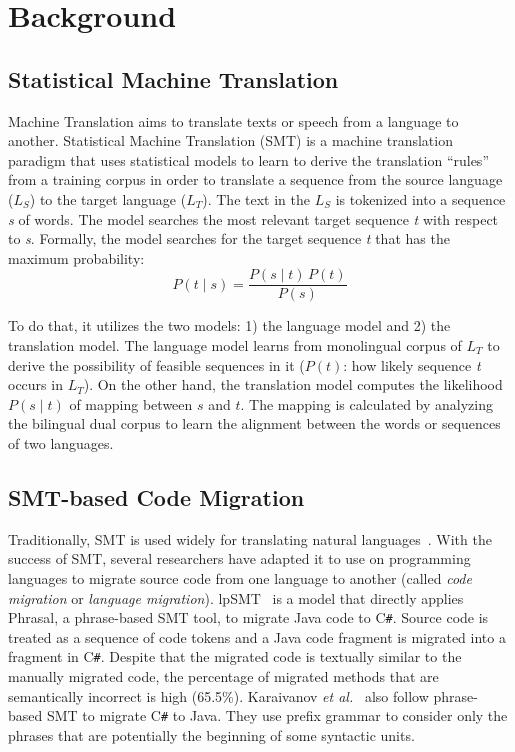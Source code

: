 \section{Background}
\label{sec:background}

\subsection{Statistical Machine Translation}

Machine Translation aims to translate texts or speech from a language to another.
%
Statistical Machine Translation (SMT) is a machine translation
paradigm that uses statistical models to learn to derive the
translation ``rules'' from a training corpus in order to translate a
sequence from the source language ($L_S$) to the target language
($L_T$). The text in the $L_S$ is tokenized into a sequence \textit{s}
of words. The model searches the most relevant target sequence
\textit{t} with respect to \textit{s}. Formally, the model searches
for the target sequence \textit{t} that has the maximum probability:
$$ P\left(t \mid s \right) = \frac{P\left(s \mid t\right) \, P\left(t\right)}{P\left(s\right)} $$

To do that, it utilizes the two models: 1) the language model and 2)
the translation model. The language model learns from monolingual
corpus of $L_T$ to derive the possibility of feasible sequences in it
($P\left(t\right)$: how likely sequence \textit{t} occurs in
$L_T$). On the other hand, the translation model computes the
likelihood $P\left(s \mid t\right)$ of mapping between $s$ and
$t$. The mapping is calculated by analyzing the bilingual dual
corpus to learn the alignment between the words or sequences of two
languages.

\subsection{SMT-based Code Migration}

Traditionally, SMT is used widely for translating natural
languages~\cite{smtbook}. With the success of SMT, several researchers
have adapted it to use on programming languages to migrate source code
from one language to another (called {\em code migration} or {\em
  language migration}). lpSMT~\cite{fse13-nier} is a model that
directly applies Phrasal, a phrase-based SMT tool, to migrate Java
code to C\texttt{\#}. Source code is treated as a sequence of code
tokens and a Java code fragment is migrated into a fragment in
C\texttt{\#}. Despite that the migrated code is textually similar to
the manually migrated code, the percentage of migrated methods that
are semantically incorrect is high (65.5\%).
%
Karaivanov {\em et al.}~\cite{karaivanov14} also follow phrase-based SMT to
migrate C\texttt{\#} to Java. They use prefix grammar to consider only
the phrases that are potentially the beginning of some syntactic
units.

